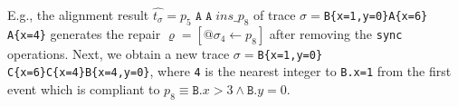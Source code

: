 E.g.,  the alignment result $\hat{t_\sigma}=p_5\;\texttt{A}\;\texttt{A}\;\textit{ins\_}p_8$ of trace $\sigma=$\texttt{B\{x=1,y=0\}A\{x=6\}\\A\{x=4\}} generates the repair $\varrho=[@\sigma_4\leftarrow p_8]$ after removing the \texttt{sync} operations. Next, we obtain a new trace $\sigma=$\texttt{B\{x=1,y=0\}$  $C\{x=6\}C\{x=4\}B\{x=4,y=0\}}, where \texttt{4} is the nearest integer to \texttt{B.x=1} from the first event which is compliant to $p_8\equiv\texttt{B}.x>3\wedge \texttt{B}.y=0$. 